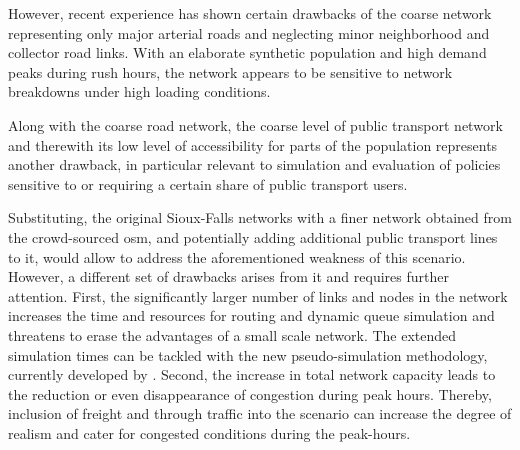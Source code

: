However, recent experience has shown certain drawbacks of the coarse network representing only major arterial roads and neglecting minor neighborhood and collector road links. With an elaborate synthetic population and high demand peaks during rush hours, the network appears to be sensitive to network breakdowns under high loading conditions. 

Along with the coarse road network, the coarse level of public transport network and therewith its low level of accessibility for parts of the population represents another drawback, in particular relevant to simulation and evaluation of policies sensitive to or requiring a certain share of public transport users. 

Substituting, the original Sioux-Falls networks with a finer network obtained from the crowd-sourced \gls{osm}, and potentially adding additional public transport lines to it, would allow to address the aforementioned weakness of this scenario. However, a different set of drawbacks arises from it and requires further attention. First, the significantly larger number of links and nodes in the network increases the time and resources for routing and dynamic queue simulation and threatens to erase the advantages of a small scale network. The extended simulation times can be tackled with the new pseudo-simulation methodology, currently developed by \citet[][]{FourieEtAl_TRR_2013}.
Second, the increase in total network capacity leads to the reduction or even disappearance of congestion during peak hours. Thereby, inclusion of freight and through traffic into the scenario can increase the degree of realism and cater for congested conditions during the peak-hours. 

